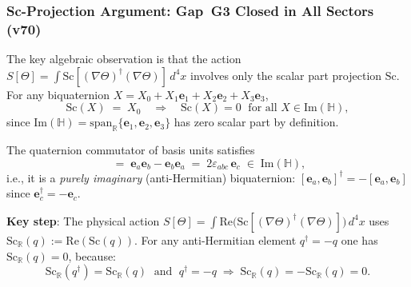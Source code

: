\documentclass[12pt,a4paper]{article}
\theoremstyle{definition}
\theoremstyle{remark}
\begin{document}
\subsubsection{Sc-Projection Argument: Gap~G3 Closed in All Sectors (v70)}
\label{subsubsec:sc_projection_g3}


The key algebraic observation is that the action
$S[\Theta] = \int \mathrm{Sc}[(\nabla\Theta)^\dagger(\nabla\Theta)]\,d^4x$
involves only the scalar part projection $\mathrm{Sc}$.  For any biquaternion
$X = X_0 + X_1\mathbf{e}_1 + X_2\mathbf{e}_2 + X_3\mathbf{e}_3$,
\begin{equation}
  \mathrm{Sc}(X) \;=\; X_0
  \quad\Longrightarrow\quad
  \mathrm{Sc}(X) = 0 \;\text{ for all } X \in \mathrm{Im}(\mathbb{H}),
  \label{eq:sc_annihilates}
\end{equation}
since $\mathrm{Im}(\mathbb{H}) = \mathrm{span}_\mathbb{R}\{\mathbf{e}_1,\mathbf{e}_2,\mathbf{e}_3\}$
has zero scalar part by definition.

The quaternion commutator of basis units satisfies
\begin{equation}
  [\mathbf{e}_a, \mathbf{e}_b]
  \;=\; \mathbf{e}_a\mathbf{e}_b - \mathbf{e}_b\mathbf{e}_a
  \;=\; 2\varepsilon_{abc}\,\mathbf{e}_c
  \;\in\; \mathrm{Im}(\mathbb{H}),
  \label{eq:commutator_in_imH}
\end{equation}
i.e., it is a \emph{purely imaginary} (anti-Hermitian) biquaternion:
$[\mathbf{e}_a,\mathbf{e}_b]^\dagger = -[\mathbf{e}_a,\mathbf{e}_b]$ since $\mathbf{e}_c^\dagger = -\mathbf{e}_c$.

\textbf{Key step}: The physical action
$S[\Theta] = \int \mathrm{Re}\bigl(\mathrm{Sc}[(\nabla\Theta)^\dagger(\nabla\Theta)]\bigr)\,d^4x$
uses $\mathrm{Sc}_\mathbb{R}(q) := \mathrm{Re}(\mathrm{Sc}(q))$.
For any anti-Hermitian element $q^\dagger = -q$ one has
$\mathrm{Sc}_\mathbb{R}(q) = 0$, because:
\begin{equation}
  \mathrm{Sc}_\mathbb{R}(q^\dagger) = \mathrm{Sc}_\mathbb{R}(q)
  \;\text{ and }\;
  q^\dagger = -q
  \;\Longrightarrow\;
  \mathrm{Sc}_\mathbb{R}(q) = -\mathrm{Sc}_\mathbb{R}(q) = 0.
  \label{eq:antiherm_sc_zero}
\end{equation}
\end{document}
